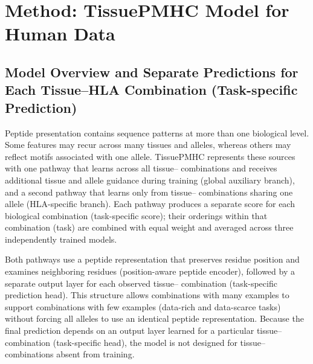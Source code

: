\section{Method: TissuePMHC Model for Human Data}

\subsection{Model Overview and Separate Predictions for Each Tissue--HLA Combination (Task-specific Prediction)}

Peptide presentation contains sequence patterns at more than one biological level. Some features may recur across many tissues and \plainHLA{} alleles, whereas others may reflect motifs associated with one allele. TissuePMHC represents these sources with one pathway that learns across all tissue--\plainHLA{} combinations and receives additional tissue and allele guidance during training (global auxiliary branch), and a second pathway that learns only from tissue--\plainHLA{} combinations sharing one \plainHLA{} allele (HLA-specific branch). Each pathway produces a separate score for each biological combination (task-specific score); their orderings within that combination (task) are combined with equal weight and averaged across three independently trained models.

Both pathways use a peptide representation that preserves residue position and examines neighboring residues (position-aware peptide encoder), followed by a separate output layer for each observed tissue--\plainHLA{} combination (task-specific prediction head). This structure allows combinations with many examples to support combinations with few examples (data-rich and data-scarce tasks) without forcing all alleles to use an identical peptide representation. Because the final prediction depends on an output layer learned for a particular tissue--\plainHLA{} combination (task-specific head), the model is not designed for tissue--\plainHLA{} combinations absent from training.

